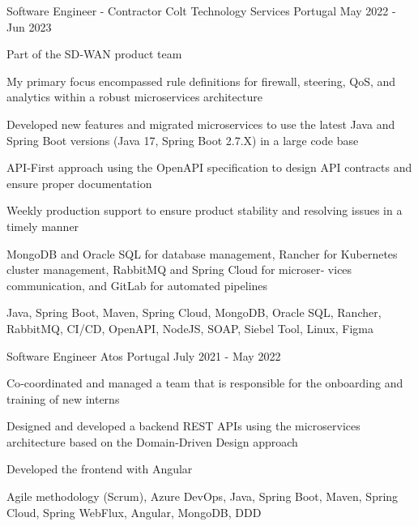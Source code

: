 \begin{cventries}
  \cventry
    {Software Engineer - Contractor} %
    {Colt Technology Services} %
    {Portugal} %
    {May 2022 - Jun 2023} %
    {
      \begin{cvitems} %
        \item {Part of the SD‑WAN product team}
        \item {My primary focus encompassed rule definitions for firewall, steering, QoS, and analytics within a robust microservices architecture}
        \item {Developed new features and migrated microservices to use the latest Java and Spring Boot versions (Java 17, Spring Boot 2.7.X) in a large code
base}
        \item {API‑First approach using the OpenAPI specification to design API contracts and ensure proper documentation}
        \item {Weekly production support to ensure product stability and resolving issues in a timely manner}
        \item {MongoDB and Oracle SQL for database management, Rancher for Kubernetes cluster management, RabbitMQ and Spring Cloud for microser‑
vices communication, and GitLab for automated pipelines}
        \item {Java, Spring Boot, Maven, Spring Cloud, MongoDB, Oracle SQL, Rancher, RabbitMQ, CI/CD, OpenAPI, NodeJS, SOAP, Siebel Tool, Linux, Figma}
      \end{cvitems}
    }

  \cventry
    {Software Engineer} %
    {Atos} %
    {Portugal} %
    {July 2021 - May 2022} %
    {
      \begin{cvitems} %
        \item {Co‑coordinated and managed a team that is responsible for the onboarding and training of new interns}
        \item {Designed and developed a backend REST APIs using the microservices architecture based on the Domain‑Driven Design approach}
        \item {Developed the frontend with Angular}
        \item {Agile methodology (Scrum), Azure DevOps, Java, Spring Boot, Maven, Spring Cloud, Spring WebFlux, Angular, MongoDB, DDD}
      \end{cvitems}
    }

\end{cventries}
